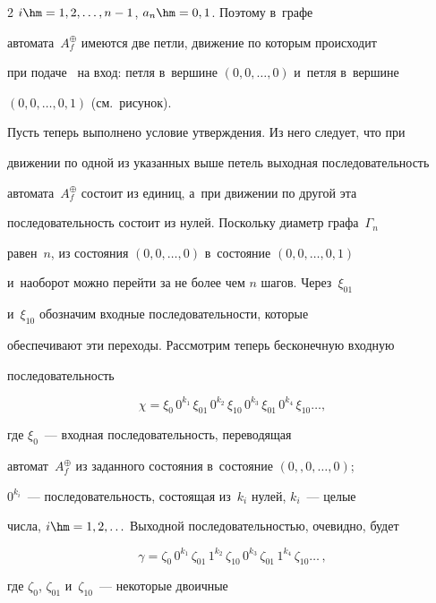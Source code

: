 \begin{multicols}{2}
$i\hm=1,2,\ldots , n-1$, $a_n\hm=0,1$. Поэтому в~графе 


автомата~$A_f^{\oplus}$ имеются две петли, движение по которым происходит 


при подаче~  на вход: петля в~вершине $(0,0,\ldots ,0)$ и~петля в~вершине 


$(0,0,\ldots , 0,1)$ (см.\ рисунок). 


  


  Пусть теперь выполнено условие утверждения. Из него следует, что при 


движении по одной из указанных выше петель выходная последовательность 


автомата~$A_f^{\oplus}$ состоит из единиц, а~при движении по другой эта 


последовательность состоит из нулей. Поскольку диаметр графа~$\Gamma_n$ 


равен~$n$, из состояния $(0,0,\ldots ,0)$ в~состояние $(0,0,\ldots , 0,1)$ 


и~наоборот можно перейти за не более чем $n$ шагов. Через~$\xi_{01}$ 


и~$\xi_{10}$   обозначим входные последовательности, которые 


обеспечивают эти переходы. Рассмотрим теперь бесконечную входную 


последовательность


  $$


  \chi=\xi_0\, 0^{k_1}\, \xi_{01}\, 0^{k_2}\, \xi_{10}\,


   0^{k_3}\, \xi_{01}\, 0^{k_4} \,


\xi_{10}\ldots ,


  $$


где $\xi_0$~--- входная последовательность, переводящая 


автомат~$A_f^{\oplus}$ из заданного состояния в~состояние $(0,,0,\ldots ,0)$; 


$0^{k_i}$~--- последовательность, состоящая из~$k_i$ нулей, $k_i$~--- целые 


числа, $i\hm=1,2,\ldots$ Выходной последовательностью, очевидно, будет


$$


\gamma= \zeta_0 \,0^{k_1} \,\zeta_{01}\, 1^{k_2}\, \zeta_{10}\, 0^{k_3}\, \zeta_{01} \,


1^{k_4}\, \zeta_{10}\ldots\,,


$$


где $\zeta_0$, $\zeta_{01}$ и~$\zeta_{10}$~--- некоторые двоичные 



\end{multicols}
